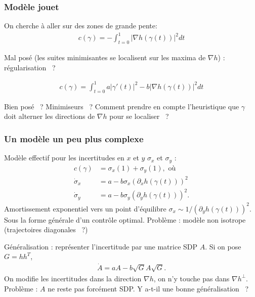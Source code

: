 \documentclass[11pt]{beamer}
\begin{document}




\begin{frame}
  \frametitle{Modèle jouet}
  On cherche à aller sur des zones de grande pente:
  \begin{align*}
    c(\gamma) = -\int_{t=0}^{1} |\nabla h(\gamma(t))|^{2}  dt
  \end{align*}

  Mal posé (les suites minimisantes se localisent sur les maxima de
  $\nabla h$) : régularisation~ ?
  
\begin{align*}
  c(\gamma) =  \int_{t=0}^{1} a |\gamma'(t)|^{2} - b |\nabla
  h(\gamma(t))|^{2} dt
\end{align*}

Bien posé~ ? Minimiseurs~ ? Comment prendre en compte l'heuristique que
$\gamma$ doit alterner les directions de $\nabla h$ pour se localiser~ ?


\end{frame}
\begin{frame}
  \frametitle{Un modèle un peu plus complexe}
Modèle effectif pour les incertitudes en $x$ et $y$ $\sigma_{x}$ et
$\sigma_{y}$ :
\begin{align*}
  c(\gamma) &= \sigma_{x}(1) + \sigma_{y}(1), \text{ où}\\
  \dot \sigma_{x} &= a - b \sigma_{x} (\partial_{x} h(\gamma(t)))^{2}\\
  \dot \sigma_{y} &= a - b \sigma_{y} (\partial_{y} h(\gamma(t)))^{2}.
\end{align*}
Amortissement exponentiel vers un point d'équilibre $\sigma_{x} \sim
1/(\partial_{y} h(\gamma(t)))^{2}$. Sous la forme générale d'un
contrôle optimal. Problème : modèle non isotrope (trajectoires
diagonales~ ?)

Généralisation : représenter l'incertitude par une matrice SDP $A$. Si
on pose $G = h h^{T}$,
\begin{align*}
  \dot A = a A - b \sqrt G A \sqrt G.
\end{align*}
On modifie les incertitudes dans la direction $\nabla h$, on n'y
touche pas dans $\nabla h^{\perp}$. Problème : $A$ ne reste
pas forcément SDP. Y a-t-il une bonne généralisation~ ?
\end{frame}
\end{document}
